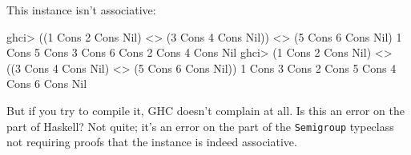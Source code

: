 \documentclass[]{article}
\newenvironment{Shaded}{}{}
\newcommand{\DataTypeTok}[1]{\textcolor[rgb]{0.56,0.13,0.00}{#1}}
\newcommand{\DecValTok}[1]{\textcolor[rgb]{0.25,0.63,0.44}{#1}}
\newcommand{\NormalTok}[1]{#1}
\newcommand{\OperatorTok}[1]{\textcolor[rgb]{0.40,0.40,0.40}{#1}}
\newcommand{\OtherTok}[1]{\textcolor[rgb]{0.00,0.44,0.13}{#1}}
\begin{document}
This instance isn't associative:

\begin{Shaded}
\begin{Highlighting}[]
\NormalTok{ghci}\OperatorTok{\textgreater{}}\NormalTok{ ((}\DecValTok{1} \OtherTok{\textasciigrave{}Cons\textasciigrave{}} \DecValTok{2} \OtherTok{\textasciigrave{}Cons\textasciigrave{}} \DataTypeTok{Nil}\NormalTok{) }\OperatorTok{\textless{}\textgreater{}}\NormalTok{ (}\DecValTok{3} \OtherTok{\textasciigrave{}Cons\textasciigrave{}} \DecValTok{4} \OtherTok{\textasciigrave{}Cons\textasciigrave{}} \DataTypeTok{Nil}\NormalTok{)) }\OperatorTok{\textless{}\textgreater{}}\NormalTok{ (}\DecValTok{5} \OtherTok{\textasciigrave{}Cons\textasciigrave{}} \DecValTok{6} \OtherTok{\textasciigrave{}Cons\textasciigrave{}} \DataTypeTok{Nil}\NormalTok{)}
\DecValTok{1} \OtherTok{\textasciigrave{}Cons\textasciigrave{}} \DecValTok{5} \OtherTok{\textasciigrave{}Cons\textasciigrave{}} \DecValTok{3} \OtherTok{\textasciigrave{}Cons\textasciigrave{}} \DecValTok{6} \OtherTok{\textasciigrave{}Cons\textasciigrave{}} \DecValTok{2} \OtherTok{\textasciigrave{}Cons\textasciigrave{}} \DecValTok{4} \OtherTok{\textasciigrave{}Cons\textasciigrave{}} \DataTypeTok{Nil}
\NormalTok{ghci}\OperatorTok{\textgreater{}}\NormalTok{ (}\DecValTok{1} \OtherTok{\textasciigrave{}Cons\textasciigrave{}} \DecValTok{2} \OtherTok{\textasciigrave{}Cons\textasciigrave{}} \DataTypeTok{Nil}\NormalTok{) }\OperatorTok{\textless{}\textgreater{}}\NormalTok{ ((}\DecValTok{3} \OtherTok{\textasciigrave{}Cons\textasciigrave{}} \DecValTok{4} \OtherTok{\textasciigrave{}Cons\textasciigrave{}} \DataTypeTok{Nil}\NormalTok{) }\OperatorTok{\textless{}\textgreater{}}\NormalTok{ (}\DecValTok{5} \OtherTok{\textasciigrave{}Cons\textasciigrave{}} \DecValTok{6} \OtherTok{\textasciigrave{}Cons\textasciigrave{}} \DataTypeTok{Nil}\NormalTok{))}
\DecValTok{1} \OtherTok{\textasciigrave{}Cons\textasciigrave{}} \DecValTok{3} \OtherTok{\textasciigrave{}Cons\textasciigrave{}} \DecValTok{2} \OtherTok{\textasciigrave{}Cons\textasciigrave{}} \DecValTok{5} \OtherTok{\textasciigrave{}Cons\textasciigrave{}} \DecValTok{4} \OtherTok{\textasciigrave{}Cons\textasciigrave{}} \DecValTok{6} \OtherTok{\textasciigrave{}Cons\textasciigrave{}} \DataTypeTok{Nil}
\end{Highlighting}
\end{Shaded}

But if you try to compile it, GHC doesn't complain at all. Is this an error on
the part of Haskell? Not quite; it's an error on the part of the
\texttt{Semigroup} typeclass not requiring proofs that the instance is indeed
associative.
\end{document}

